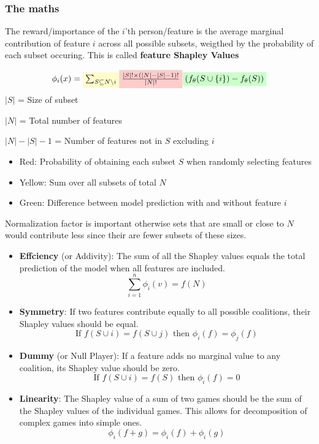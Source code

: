 \subsubsection{The maths}
The reward/importance of the \(i\)'th person/feature is the average marginal contribution of feature \(i\) across all possible subsets, weigthed by the probability of each subset occuring.
This is called \textbf{feature Shapley Values}

\[
\phi_i(x) = \colorbox{yellow!20}{$\sum_{S \subseteq N \setminus{i}}$} \colorbox{red!20}{$\frac{|S|! \times \left(|N|- |S|-1\right)!}{|N|!}$}\colorbox{green!20}{$\left(f_\theta (S \cup \left\{i\right\})-f_\theta (S)\right)$}
\]
\(|S|\) = Size of subset

\(|N|\) = Total number of features

\(|N|-|S|-1\) = Number of features not in \(S\) excluding \(i\)
\begin{itemize}
    \item \colorbox{red!20}{Red}: Probability of obtaining each subset \(S\) when randomly selecting features
    \item \colorbox{yellow!20}{Yellow}: Sum over all subsets of total \(N\)
    \item \colorbox{green!20}{Green}: Difference between model prediction with and without feature \(i\)
\end{itemize}
Normalization factor is important otherwise sets that are small or close to \(N\) would contribute less since their are fewer subsets of these sizes.
\begin{itemize}
    \item \textbf{Effciency} (or Addivity): The sum of all the Shapley values equals the total prediction of the model when all features are included.
    \[
    \sum_{i = 1}^{n} \phi_i(v) = f(N)
    \]
    \item \textbf{Symmetry}: If two features contribute equally to all possible coalitions, their Shapley values should be equal.
    \[
    \text{If \(f(S\cup i) = f(S \cup j)\)  then \(\phi_i(f) = \phi_j(f)\)}
    \]
    \item \textbf{Dummy} (or Null Player): If a feature adds no marginal value to any coalition, its Shapley value should be zero.
    \[
    \text{If \(f(S\cup i) = f(S)\)  then \(\phi_i(f) = 0\)}
    \]
    \item \textbf{Linearity}: The Shapley value of a sum of two games should be the sum of the Shapley values of the individual games. This allows for decomposition of complex games into simple ones.
    \[
    \phi_i(f+g) = \phi_i(f) + \phi_i(g)
    \]
\end{itemize}
